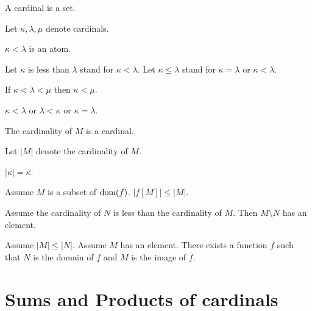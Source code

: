 \documentclass{article}
\begin{document}
\begin{forthel}
  \begin{signature}
    A cardinal is a set.
  \end{signature}

  Let $\kappa, \lambda, \mu$ denote cardinals.

  \begin{signature}
    $\kappa < \lambda$ is an atom.
  \end{signature}

  Let $\kappa$ is less than $\lambda$ stand for $\kappa < \lambda$.
  Let $\kappa \leq \lambda$ stand for $\kappa = \lambda$ or $\kappa < \lambda$.

  \begin{axiom}
    If $\kappa < \lambda < \mu$ then $\kappa < \mu$.
  \end{axiom}

  \begin{axiom}
    $\kappa < \lambda$ or $\lambda < \kappa$ or $\kappa = \lambda$.
  \end{axiom}

  \begin{signature}
    The cardinality of $M$ is a cardinal.
  \end{signature}

  Let $|M|$ denote the cardinality of $M$.

  \begin{axiom}
    $|\kappa| = \kappa$.
  \end{axiom}

  \begin{axiom}
    Assume $M$ is a subset of $\operatorname{dom}(f)$.
    $|f[M]| \leq |M|$.
  \end{axiom}

  \begin{axiom}
    Assume the cardinality of $N$ is less than the cardinality of $M$.
    Then $M \setminus N$ has an element.
  \end{axiom}

  \begin{axiom}
    Assume $|M| \leq |N|$.
    Assume $M$ has an element.
    There exists a function $f$ such that $N$ is the domain of $f$ and $M$ is
    the image of $f$.
  \end{axiom}
\end{forthel}


\section{Sums and Products of cardinals}
\end{document}
